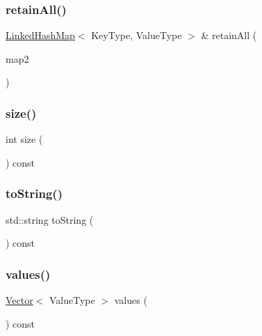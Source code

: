 \subsubsection{\texorpdfstring{retain\+All()}{retainAll()}}
{\footnotesize\ttfamily \mbox{\hyperlink{classLinkedHashMap}{Linked\+Hash\+Map}}$<$ Key\+Type, Value\+Type $>$ \& retain\+All (\begin{DoxyParamCaption}\item[{const \mbox{\hyperlink{classLinkedHashMap}{Linked\+Hash\+Map}}$<$ Key\+Type, Value\+Type $>$ \&}]{map2 }\end{DoxyParamCaption})}

\mbox{\label{classLinkedHashMap_af9593d4a5ff4274efaf429cb4f9e57cc}} 
\subsubsection{\texorpdfstring{size()}{size()}}
{\footnotesize\ttfamily int size (\begin{DoxyParamCaption}{ }\end{DoxyParamCaption}) const}

\mbox{\label{classLinkedHashMap_a1fe5121d6528fdea3f243321b3fa3a49}} 
\subsubsection{\texorpdfstring{to\+String()}{toString()}}
{\footnotesize\ttfamily std\+::string to\+String (\begin{DoxyParamCaption}{ }\end{DoxyParamCaption}) const}

\mbox{\label{classLinkedHashMap_a50ccbe4184324f0da975648a12728d20}} 
\subsubsection{\texorpdfstring{values()}{values()}}
{\footnotesize\ttfamily \mbox{\hyperlink{classVector}{Vector}}$<$ Value\+Type $>$ values (\begin{DoxyParamCaption}{ }\end{DoxyParamCaption}) const}



